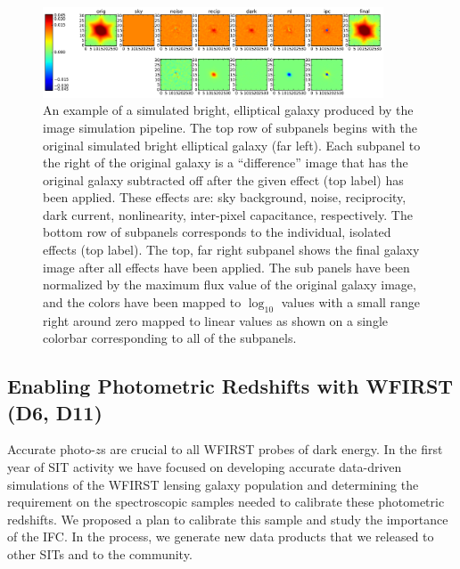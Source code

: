 \begin{figure}[!t]
  \includegraphics[width=0.9\textwidth]{Plots/wfirst_wl_imsim_example.pdf}
\caption{\label{fig:wl_imsim} An example of a simulated bright, elliptical galaxy produced by the image simulation pipeline.  The top row of subpanels begins with the original simulated bright elliptical galaxy (far left).  Each subpanel to the right of the original galaxy is a ``difference'' image that has the original galaxy subtracted off after the given effect (top label) has been applied.  These effects are: sky background, noise, reciprocity, dark current, nonlinearity, inter-pixel capacitance, respectively.  The bottom row of subpanels corresponds to the individual, isolated effects (top label).  The top, far right subpanel shows the final galaxy image after all effects have been applied.  The sub panels have been normalized by the maximum flux value of the original galaxy image, and the colors have been mapped to $\log_{10}$ values with a small range right around zero mapped to linear values as shown on a single colorbar corresponding to all of the subpanels.}
\end{figure}

\subsection{Enabling Photometric Redshifts with WFIRST (D6, D11)}
\label{sec:wl_photoz}

\begin{summaryii}
Accurate photo-$z$s are crucial to all WFIRST probes of dark energy. In the
first year of SIT activity we have focused on developing accurate data-driven
simulations of the WFIRST lensing galaxy population and determining the
requirement on the spectroscopic samples needed to calibrate these photometric
redshifts. We proposed a plan to calibrate this sample and study the importance of the IFC. In the process, we generate new
data products that we released to other SITs and to the community.
\end{summaryii}

